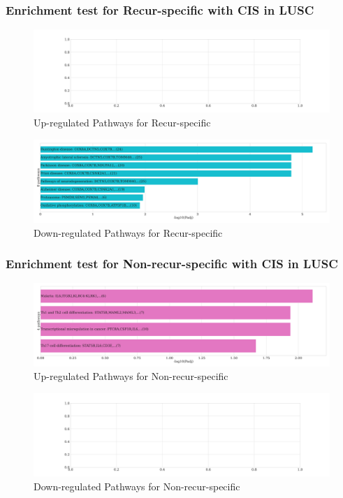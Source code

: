 \documentclass{beamer}
\begin{document}
    \begin{frame}
        \frametitle{Enrichment test for Recur-specific with CIS in LUSC}

        \begin{figure}
            \includegraphics[width=0.8 \linewidth]{figures/DEG/Enrichment/STAR.SQC-CIS.Recur.Up.KEGG.pdf}
            \caption{Up-regulated Pathways for Recur-specific}
        \end{figure}

        \begin{figure}
            \includegraphics[width=0.8 \linewidth]{figures/DEG/Enrichment/STAR.SQC-CIS.Recur.Down.KEGG.pdf}
            \caption{Down-regulated Pathways for Recur-specific}
        \end{figure}
    \end{frame}

    \begin{frame}
        \frametitle{Enrichment test for Non-recur-specific with CIS in LUSC}

        \begin{figure}
            \includegraphics[width=0.8 \linewidth]{figures/DEG/Enrichment/STAR.SQC-CIS.Nonrecur.Up.KEGG.pdf}
            \caption{Up-regulated Pathways for Non-recur-specific}
        \end{figure}

        \begin{figure}
            \includegraphics[width=0.8 \linewidth]{figures/DEG/Enrichment/STAR.SQC-CIS.Nonrecur.Down.KEGG.pdf}
            \caption{Down-regulated Pathways for Non-recur-specific}
        \end{figure}
    \end{frame}
\end{document}
